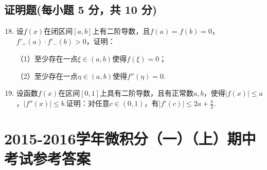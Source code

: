 \documentclass[../Main.tex]{subfiles}
\begin{document}
\section{证明题(每小题 5 分，共 10 分)}
\begin{enumerate}
    \setcounter{enumi}{17}
    \item 设$f(x)$在闭区间$[a,b]$上有二阶导数，且$f(a)=f(b)=0$，$f'_{+}(a)\cdot
              f'_{-}(b)>0$，证明：

          （1）至少存在一点$\xi\in(a,b)$使得$f(\xi)=0$；

          （2）至少存在一点$\eta\in(a,b)$使得$f''(\eta)=0$.
          \vspace{10em}

    \item 设函数$f(x)$在区间$[0,1]$上具有二阶导数，且有正常数$a,b$，使得$|f(
              x)|\leq a$，$|f''(x)|\leq b$.证明：对任意$c\in(0,1)$，有$|f'(c)|\leq 2a+\frac{b}{2}$.
          \vspace{10em}
\end{enumerate}

\chapter{2015-2016学年微积分（一）（上）期中考试参考答案}
\end{document}
